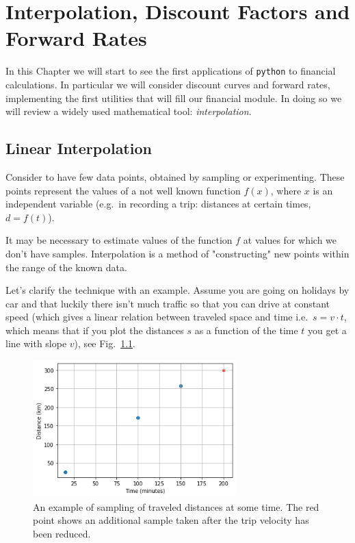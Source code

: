 \chapter{Interpolation, Discount Factors and Forward Rates}\label{interpolation---practical-lesson-3}

In this Chapter we will start to see the first applications of \texttt{python} to financial calculations.
In particular we will consider discount curves and forward rates, implementing the first utilities that will fill our financial module.
In doing so we will review a widely used mathematical tool: \emph{interpolation}.

\section{Linear Interpolation}\label{linear-interpolation}

Consider to have few data points, obtained by sampling or experimenting. These points represent the values of a not well known function \(f(x)\), where \(x\) is an independent variable (e.g.~in recording a trip: distances at certain times, \(d = f(t)\)).

It may be necessary to estimate values of the function $f$ at values for which we don't have samples.
Interpolation is a method of "constructing" new points within the range of the known data.

Let's clarify the technique with an example.
Assume you are going on holidays by car and that luckily there isn't much traffic so that you can drive at constant speed (which gives a linear relation between traveled space and time i.e.~\(s = v \cdot t\), which means that if you plot the distances \(s\) as a function of the time \(t\) you get a line with slope \(v\)), see Fig.~\ref{fig:samples_for_interpolation}.

\begin{figure}
  \centering
  \includegraphics[width=0.7\textwidth]{figures/interp_example1.png}
  \caption{An example of sampling of traveled distances at some time. The red point shows an additional sample taken after the trip velocity has been reduced.}
  \label{fig:samples_for_interpolation}
\end{figure}

